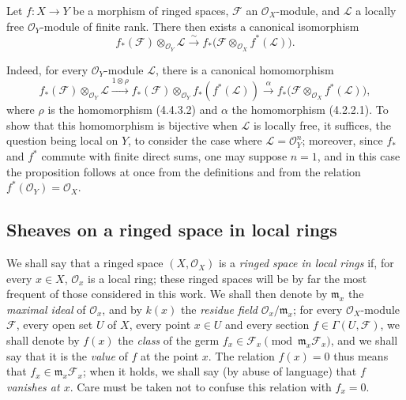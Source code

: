 \begin{env}[5.4.10]
\label{0.5.4.10}
Let $f:X\to Y$ be a morphism of ringed spaces, $\mathcal{F}$ an
$\mathcal{O}_X$-module, and $\mathcal{L}$ a locally free
$\mathcal{O}_Y$-module of finite rank. There then exists a canonical isomorphism
\[
  f_*(\mathcal{F})\otimes_{\mathcal{O}_Y}\mathcal{L}
  \xrightarrow{\sim}
  f_*\bigl(\mathcal{F}\otimes_{\mathcal{O}_X}f^*(\mathcal{L})\bigr).
  \tag{5.4.10.1}\label{0.5.4.10.1}
\]


Indeed, for every $\mathcal{O}_Y$-module $\mathcal{L}$, there is a
canonical homomorphism
\[
  f_*(\mathcal{F})\otimes_{\mathcal{O}_Y}\mathcal{L}
  \xrightarrow{1\otimes\rho}
  f_*(\mathcal{F})\otimes_{\mathcal{O}_Y}f_*(f^*(\mathcal{L}))
  \xrightarrow{\alpha}
  f_*\bigl(\mathcal{F}\otimes_{\mathcal{O}_X}f^*(\mathcal{L})\bigr),
\]
where $\rho$ is the homomorphism (4.4.3.2) and $\alpha$ the homomorphism (4.2.2.1).
To show that this homomorphism is bijective when $\mathcal{L}$ is locally free,
it suffices, the question being local on $Y$, to consider the
case where $\mathcal{L}=\mathcal{O}_Y^n$; moreover, since $f_*$ and $f^*$ commute with
finite direct sums, one may suppose $n=1$, and in this case the proposition
follows at once from the definitions and from the relation
$f^*(\mathcal{O}_Y)=\mathcal{O}_X$.
\end{env}


\subsection{Sheaves on a ringed space in local rings}
\label{subsection:0.5.5}

\begin{env}[5.5.1]
\label{0.5.5.1}
We shall say that a ringed space $(X,\mathcal{O}_X)$ is a \emph{ringed
space in local rings} if, for every $x\in X$, $\mathcal{O}_x$ is a
local ring; these ringed spaces will be by far the most frequent of those
considered in this work. We shall then denote by
$\mathfrak{m}_x$ the \emph{maximal ideal} of $\mathcal{O}_x$, and by $k(x)$ the
\emph{residue field} $\mathcal{O}_x/\mathfrak{m}_x$; for every
$\mathcal{O}_X$-module $\mathcal{F}$, every open set $U$ of $X$, every point
$x\in U$ and every section $f\in\Gamma(U,\mathcal{F})$, we shall denote by
$f(x)$ the \emph{class} of the germ
$f_x\in\mathcal{F}_x\pmod{\mathfrak{m}_x\mathcal{F}_x}$, and we shall say that
it is the \emph{value} of $f$ at the point $x$. The relation $f(x)=0$ thus
means that $f_x\in\mathfrak{m}_x\mathcal{F}_x$; when it holds, we shall say
(by abuse of language) that $f$ \emph{vanishes at $x$}. Care must be taken not to
confuse this relation with $f_x=0$.
\end{env}


